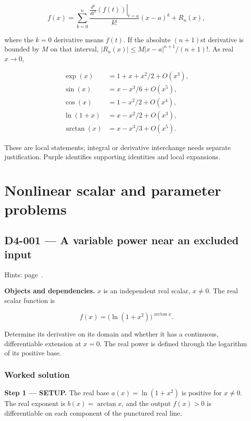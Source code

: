 \documentclass[11pt,oneside,openany]{book}
\begin{document}
\begin{minipage}[t]{0.485\textwidth}
\[
f(x)=\sum_{k=0}^{n}\frac{\left.\frac{d^k}{dt^k}(f(t))\right|_{t=a}}{k!}(x-a)^k+R_n(x),
\]

where the \(k=0\) derivative means \(f(t)\). If the absolute \((n+1)\)st derivative
is bounded by \(M\) on that interval,
\(|R_n(x)|\le M|x-a|^{n+1}/(n+1)!\).
As real \(x\to0\),

\[
\begin{aligned}
\exp(x)&=1+x+x^2/2+O(x^3),\\
\sin(x)&=x-x^3/6+O(x^5),\\
\cos(x)&=1-x^2/2+O(x^4),\\
\ln(1+x)&=x-x^2/2+O(x^3),\\
\arctan(x)&=x-x^3/3+O(x^5).
\end{aligned}
\]

These are local statements; integral or derivative interchange needs separate
justification. Purple identifies supporting identities and local expansions.\endgroup
\end{minipage}

\label{quick-reference:end}
\clearpage
\endgroup
\restoregeometry
\pagestyle{fancy}

\chapter{Nonlinear scalar and parameter problems}
\markright{}
\section{D4-001 --- A variable power near an excluded input}
\label{problem:D4-001}
{\small Hints: page~\pageref{hints:D4-001}.}\par\medskip

\textbf{Objects and dependencies.} \(x\) is an independent real scalar, \(x\ne0\). The real scalar function is

\[
f(x)=\bigl(\ln(1+x^2)\bigr)^{\arctan x}.
\]

Determine its derivative on its domain and whether it has a continuous, differentiable extension at \(x=0\). The real power is defined through the logarithm of its positive base.
\subsection*{Worked solution}

\textbf{Step 1 --- SETUP.} The real base \(a(x)=\ln(1+x^2)\) is positive for \(x\ne0\). The real exponent is \(b(x)=\arctan x\), and the output \(f(x)>0\) is differentiable on each component of the punctured real line.
\end{document}
